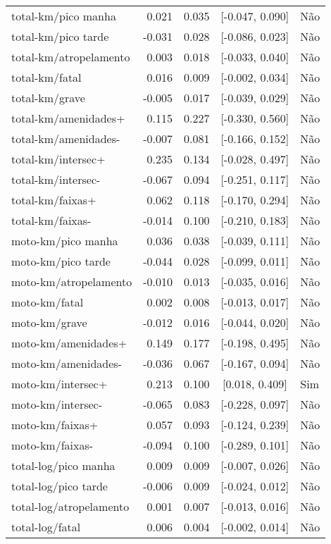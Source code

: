 \begin{longtable}{lrrcl}
total-km/pico manha & 0.021 & 0.035 & {}[-0.047, 0.090] & Não\\
total-km/pico tarde & -0.031 & 0.028 & {}[-0.086, 0.023] & Não\\
total-km/atropelamento & 0.003 & 0.018 & {}[-0.033, 0.040] & Não\\
total-km/fatal & 0.016 & 0.009 & {}[-0.002, 0.034] & Não\\
total-km/grave & -0.005 & 0.017 & {}[-0.039, 0.029] & Não\\
total-km/amenidades+ & 0.115 & 0.227 & {}[-0.330, 0.560] & Não\\
total-km/amenidades- & -0.007 & 0.081 & {}[-0.166, 0.152] & Não\\
total-km/intersec+ & 0.235 & 0.134 & {}[-0.028, 0.497] & Não\\
total-km/intersec- & -0.067 & 0.094 & {}[-0.251, 0.117] & Não\\
total-km/faixas+ & 0.062 & 0.118 & {}[-0.170, 0.294] & Não\\
total-km/faixas- & -0.014 & 0.100 & {}[-0.210, 0.183] & Não\\
moto-km/pico manha & 0.036 & 0.038 & {}[-0.039, 0.111] & Não\\
moto-km/pico tarde & -0.044 & 0.028 & {}[-0.099, 0.011] & Não\\
moto-km/atropelamento & -0.010 & 0.013 & {}[-0.035, 0.016] & Não\\
moto-km/fatal & 0.002 & 0.008 & {}[-0.013, 0.017] & Não\\
moto-km/grave & -0.012 & 0.016 & {}[-0.044, 0.020] & Não\\
moto-km/amenidades+ & 0.149 & 0.177 & {}[-0.198, 0.495] & Não\\
moto-km/amenidades- & -0.036 & 0.067 & {}[-0.167, 0.094] & Não\\
moto-km/intersec+ & 0.213 & 0.100 & {}[0.018, 0.409] & Sim\\
moto-km/intersec- & -0.065 & 0.083 & {}[-0.228, 0.097] & Não\\
moto-km/faixas+ & 0.057 & 0.093 & {}[-0.124, 0.239] & Não\\
moto-km/faixas- & -0.094 & 0.100 & {}[-0.289, 0.101] & Não\\
total-log/pico manha & 0.009 & 0.009 & {}[-0.007, 0.026] & Não\\
total-log/pico tarde & -0.006 & 0.009 & {}[-0.024, 0.012] & Não\\
total-log/atropelamento & 0.001 & 0.007 & {}[-0.013, 0.016] & Não\\
total-log/fatal & 0.006 & 0.004 & {}[-0.002, 0.014] & Não\\

\end{longtable}
